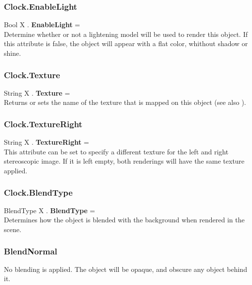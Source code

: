 \subsubsection{Clock.EnableLight \label{F:Clock:EnableLight}}
Bool X . \textbf{EnableLight} = \\
Determine whether or not a lightening model will be used to render this object. If this attribute is false, the object will appear with a flat color, whithout shadow or shine.

\subsubsection{Clock.Texture \label{F:Clock:Texture}}
String X . \textbf{Texture} = \\
Returns or sets the name of the texture that is mapped on this object (see also ).

\subsubsection{Clock.TextureRight \label{F:Clock:TextureRight}}
String X . \textbf{TextureRight} = \\
This attribute can be set to specify a different texture for the left and right stereoscopic image. If it is left empty, both renderings will have the same texture applied.

\subsubsection{Clock.BlendType \label{F:Clock:BlendType}}
BlendType X . \textbf{BlendType} = \\
Determines how the object is blended with the background when rendered in the scene.

\subsubsection{BlendNormal \label{T:BlendType|BlendNormal}}
No blending is applied. The object will be opaque, and obscure any object behind it.

